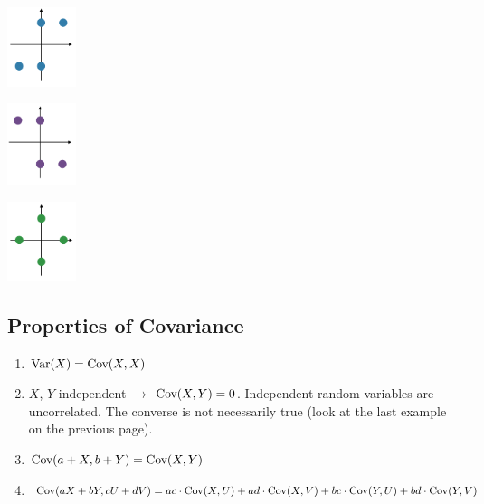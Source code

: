 \documentclass{exam}
\begin{document}
\begin{minipage}[b]{0.3\linewidth}
\begin{center}
\includegraphics[width=2cm]{llse_cov2.jpg}
\end{center}
\end{minipage}%
\hfill
\begin{minipage}[b]{0.3\linewidth}
\begin{center}
\includegraphics[width=2cm]{llse_cov1.jpg}
\end{center}
\end{minipage}%
\hfill
\begin{minipage}[b]{0.3\linewidth}
\begin{center}
\includegraphics[width=2cm]{llse_cov3.jpg}
\end{center}

\end{minipage}

\subsection{Properties of Covariance}
\begin{enumerate}
\item $\text{Var}(X)  = \text{Cov}(X, X)$
\item $X$, $Y$ independent $\rightarrow$ $\text{Cov}(X, Y) = 0$. Independent random variables are uncorrelated. The converse is not necessarily true (look at the last example on the previous page).
\item $\text{Cov}(a + X, b + Y) = \text{Cov}(X, Y)$
\item $\text{Cov}(aX + bY, cU + dV) = ac \cdot \text{Cov}(X, U) + ad \cdot \text{Cov}(X, V) + bc \cdot \text{Cov}(Y, U) + bd \cdot \text{Cov}(Y, V)$
\end{enumerate}
\end{document}
